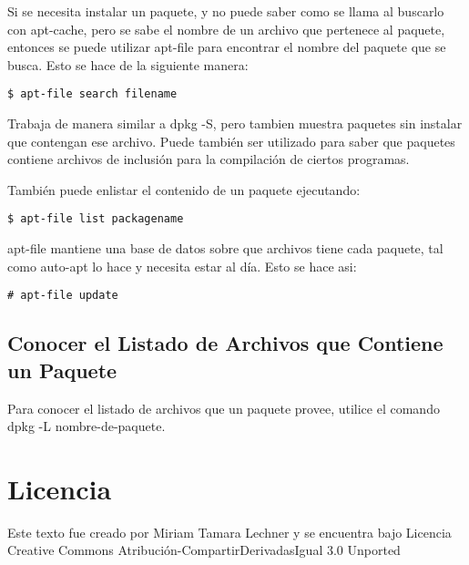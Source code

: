 \documentclass[12pt]{article}
\begin{document}
Si se necesita instalar un paquete, y no puede saber como se llama al buscarlo con apt-cache, pero se sabe el nombre de un archivo que pertenece al paquete, entonces se puede utilizar apt-file para encontrar el nombre del paquete que se busca. Esto se hace de la siguiente manera:

{\tt     \$ apt-file search filename}

Trabaja de manera similar a dpkg -S, pero tambien muestra paquetes sin instalar que contengan ese archivo. Puede también ser utilizado para saber que paquetes contiene archivos de inclusión para la compilación de ciertos programas.

También puede enlistar el contenido de un paquete ejecutando:

   {\tt  \$ apt-file list packagename}

apt-file mantiene una base de datos sobre que archivos tiene cada paquete, tal como auto-apt lo hace y necesita estar al día. Esto se hace asi:

     {\tt\# apt-file update}


\subsection*{Conocer el Listado de Archivos que Contiene un Paquete}


Para conocer el listado de archivos que un paquete provee, utilice el comando dpkg -L nombre-de-paquete.





\section*{Licencia}

Este texto fue creado por Miriam Tamara Lechner y se encuentra bajo 
Licencia Creative Commons Atribución-CompartirDerivadasIgual 3.0 Unported
\end{document}
